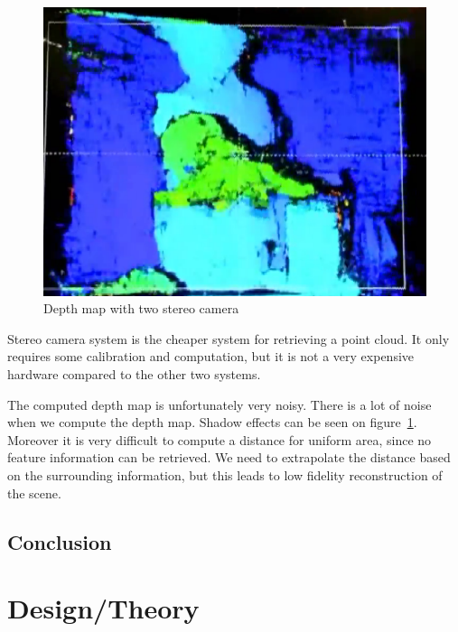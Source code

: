 \documentclass[12pt]{article}
\begin{document}
\begin{figure}[h]
  \centering
  \includegraphics[scale=0.3]{EtronDepth.png}
  \caption{\label{etron} Depth map with two stereo camera}
\end{figure}

Stereo camera system is the cheaper system for retrieving a point cloud. It only requires some calibration and computation, but it is not a very expensive hardware compared to the other two systems.

The computed depth map is unfortunately very noisy. There is a lot of noise when we compute the depth map. Shadow effects can be seen on figure~\ref{etron}. Moreover it is very difficult to compute a distance for uniform area, since no feature information can be retrieved. We need to extrapolate the distance based  on the surrounding information, but this leads to low fidelity reconstruction of the scene.

\subsection{Conclusion}

\newpage
\section{Design/Theory}
\end{document}
